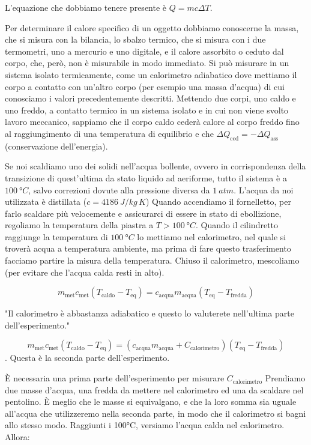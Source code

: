 \documentclass{article}
\begin{document}
    L'equazione che dobbiamo tenere presente è $Q=m c \Delta T$.

    Per determinare il calore specifico di un oggetto dobbiamo conoscerne la massa,
    che si misura con la bilancia, lo sbalzo termico, che si misura con i due
    termometri, uno a mercurio e uno digitale, e il calore assorbito o ceduto dal
    corpo, che, però, non è misurabile in modo immediato.
    Si può misurare in un sistema isolato termicamente, come un calorimetro adiabatico
    dove mettiamo il corpo a contatto con un'altro corpo (per esempio una massa
    d'acqua) di cui conosciamo i valori precedentemente descritti.
    Mettendo due corpi, uno caldo e uno freddo, a contatto termico in un sistema
    isolato e in cui non viene svolto lavoro meccanico, sappiamo che il corpo caldo
    cederà calore al corpo freddo fino al raggiungimento di una temperatura di
    equilibrio e che $\Delta Q_\text{ced}=-\Delta Q_\text{ass}$ (conservazione dell'energia).

    Se noi scaldiamo uno dei solidi  %
    nell'acqua bollente, ovvero in corrispondenza
    della transizione di quest'ultima da stato liquido ad aeriforme, tutto il sistema
    è a $\qty{100}{\degree C}$, salvo correzioni dovute alla pressione diversa da $\qty{1}{atm}$.
    L'acqua da noi utilizzata è distillata ($c=\qty{4186}{J \per kg\,K}$)
    Quando accendiamo il fornelletto, per farlo scaldare più velocemente e assicurarci
    di essere in stato di ebollizione, regoliamo la temperatura della piastra a
    $T>\qty{100}{\degree C}$.
    Quando il cilindretto raggiunge la temperatura di $\qty{100}{\degree C}$ lo mettiamo nel calorimetro,
    nel quale si troverà acqua a temperatura ambiente, ma prima di fare questo
    trasferimento facciamo partire la misura della temperatura. Chiuso il calorimetro,
    mescoliamo (per evitare che l'acqua calda resti in alto).

    \[
        m_\text{met} c_\text{met} (T_\text{caldo}-T_\text{eq}) =
        c_\text{acqua} m_\text{acqua} (T_\text{eq}-T_\text{fredda})
    \]

    "Il calorimetro è abbastanza adiabatico e questo lo valuterete nell'ultima parte
    dell'esperimento."

    \[
        m_\text{met} c_\text{met} (T_\text{caldo}-T_\text{eq}) =
        (c_\text{acqua} m_\text{acqua} + C_\text{calorimetro}) (T_\text{eq}-T_\text{fredda})
    \]. Questa è la seconda parte dell'esperimento.

    È necessaria una prima parte dell'esperimento per misurare $C_\text{calorimetro}$
    Prendiamo due masse d'acqua, una fredda da mettere nel calorimetro ed una da
    scaldare nel pentolino. È meglio che le masse si equivalgano, e che la loro
    somma sia uguale all'acqua che utilizzeremo nella seconda parte, in modo che
    il calorimetro si bagni allo stesso modo.
    Raggiunti i 100°C, versiamo l'acqua calda nel calorimetro. Allora:
\end{document}
